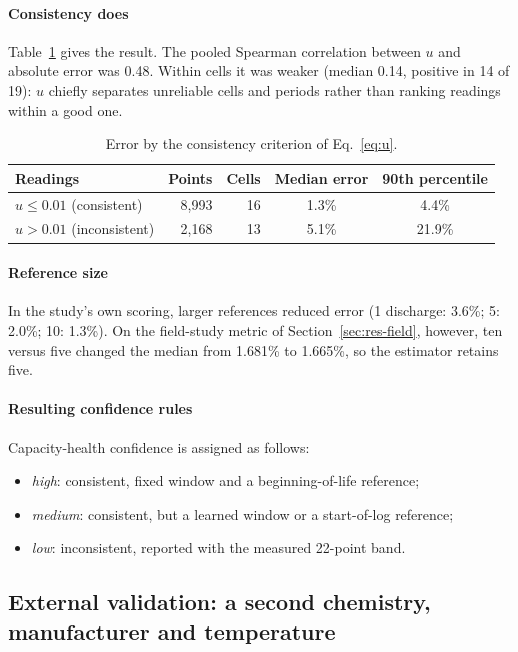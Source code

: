 \documentclass[preprint,12pt,authoryear]{elsarticle}
\begin{document}
\paragraph{Consistency does}
Table~\ref{tab:suff} gives the result. The pooled Spearman correlation between
$u$ and absolute error was 0.48. Within cells it was weaker (median 0.14,
positive in 14 of 19): $u$ chiefly separates unreliable cells and periods rather
than ranking readings within a good one.

\begin{table}[t]
\centering
\caption{Error by the consistency criterion of Eq.~\eqref{eq:u}.}
\label{tab:suff}
\begin{tabular}{lrrcc}
\toprule
Readings & Points & Cells & Median error & 90th percentile \\
\midrule
$u \le 0.01$ (consistent) & 8{,}993 & 16 & 1.3\% & 4.4\% \\
$u > 0.01$ (inconsistent) & 2{,}168 & 13 & 5.1\% & 21.9\% \\
\bottomrule
\end{tabular}
\end{table}

\paragraph{Reference size}
In the study's own scoring, larger references reduced error (1 discharge:
3.6\%; 5: 2.0\%; 10: 1.3\%). On the field-study metric of
Section~\ref{sec:res-field}, however, ten versus five changed the median from
1.681\% to 1.665\%, so the estimator retains five.

\paragraph{Resulting confidence rules}
Capacity-health confidence is assigned as follows:
\begin{itemize}
\item \emph{high}: consistent, fixed window and a beginning-of-life reference;
\item \emph{medium}: consistent, but a learned window or a start-of-log
reference;
\item \emph{low}: inconsistent, reported with the measured 22-point band.
\end{itemize}

\subsection{External validation: a second chemistry, manufacturer and temperature}
\label{sec:res-oxford}
\end{document}
